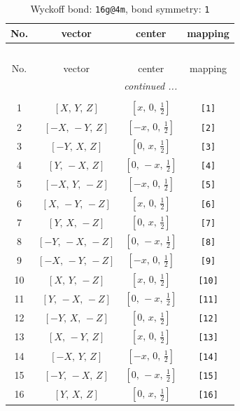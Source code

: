 \documentclass[fleqn,8pt]{jsarticle}
\begin{document}
\begin{longtable}{cccc}
\caption{Wyckoff bond: {\tt 16g@4m}, bond symmetry: {\tt 1}}
 \\
 \hline \hline
No. & vector & center & mapping \\ \hline \endfirsthead

\multicolumn{3}{l}{\tablename\ \thetable{}} \\
 \hline \hline
No. & vector & center & mapping \\ \hline \endhead

 \hline \hline
\multicolumn{3}{r}{\footnotesize\it continued ...} \\ \endfoot

 \hline \hline
\multicolumn{3}{r}{} \\ \endlastfoot

1 & $\left[ X,\, Y,\, Z \right]$ & $\left[ x,\, 0,\, \frac{1}{2} \right]$ & {\tt [1]} \\ \hline
2 & $\left[ - X,\, - Y,\, Z \right]$ & $\left[ - x,\, 0,\, \frac{1}{2} \right]$ & {\tt [2]} \\ \hline
3 & $\left[ - Y,\, X,\, Z \right]$ & $\left[ 0,\, x,\, \frac{1}{2} \right]$ & {\tt [3]} \\ \hline
4 & $\left[ Y,\, - X,\, Z \right]$ & $\left[ 0,\, - x,\, \frac{1}{2} \right]$ & {\tt [4]} \\ \hline
5 & $\left[ - X,\, Y,\, - Z \right]$ & $\left[ - x,\, 0,\, \frac{1}{2} \right]$ & {\tt [5]} \\ \hline
6 & $\left[ X,\, - Y,\, - Z \right]$ & $\left[ x,\, 0,\, \frac{1}{2} \right]$ & {\tt [6]} \\ \hline
7 & $\left[ Y,\, X,\, - Z \right]$ & $\left[ 0,\, x,\, \frac{1}{2} \right]$ & {\tt [7]} \\ \hline
8 & $\left[ - Y,\, - X,\, - Z \right]$ & $\left[ 0,\, - x,\, \frac{1}{2} \right]$ & {\tt [8]} \\ \hline
9 & $\left[ - X,\, - Y,\, - Z \right]$ & $\left[ - x,\, 0,\, \frac{1}{2} \right]$ & {\tt [9]} \\ \hline
10 & $\left[ X,\, Y,\, - Z \right]$ & $\left[ x,\, 0,\, \frac{1}{2} \right]$ & {\tt [10]} \\ \hline
11 & $\left[ Y,\, - X,\, - Z \right]$ & $\left[ 0,\, - x,\, \frac{1}{2} \right]$ & {\tt [11]} \\ \hline
12 & $\left[ - Y,\, X,\, - Z \right]$ & $\left[ 0,\, x,\, \frac{1}{2} \right]$ & {\tt [12]} \\ \hline
13 & $\left[ X,\, - Y,\, Z \right]$ & $\left[ x,\, 0,\, \frac{1}{2} \right]$ & {\tt [13]} \\ \hline
14 & $\left[ - X,\, Y,\, Z \right]$ & $\left[ - x,\, 0,\, \frac{1}{2} \right]$ & {\tt [14]} \\ \hline
15 & $\left[ - Y,\, - X,\, Z \right]$ & $\left[ 0,\, - x,\, \frac{1}{2} \right]$ & {\tt [15]} \\ \hline
16 & $\left[ Y,\, X,\, Z \right]$ & $\left[ 0,\, x,\, \frac{1}{2} \right]$ & {\tt [16]} \\
\end{longtable}
\end{document}
